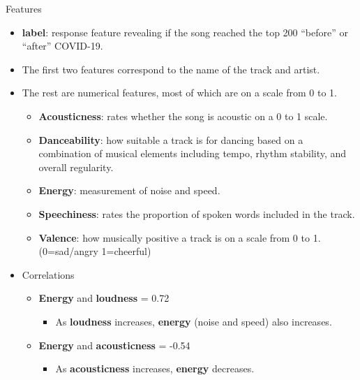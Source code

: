 \documentclass[landscape,a0paper,fontscale=0.34]{baposter}
\newcommand{\compresslistless}{%
 \setlength{\itemsep}{3.25pt}%
 \setlength{\parskip}{0pt}%
 \setlength{\parsep}{0pt}%
}
\newcommand{\rc}[1]{{\color{red}#1}}
\newcommand{\gc}[1]{{\color{green}#1}}
\begin{document}
\begin{poster}
\begin{posterbox}[name=features,column=0,row=0,span=1,below = intro]{Features}
    \compresslistless
\begin{itemize}[noitemsep]
    \item \textbf{label}: response feature revealing if the song reached the top 200 “before” or “after” COVID-19.
    \item The first two features correspond to the name of the track and artist.
	\item The rest are numerical features, most of which are on a scale from 0 to 1.
		\begin{itemize}[noitemsep]
		    \item \textbf{Acousticness}: rates whether the song is acoustic on a 0 to 1 scale.
		    \item \textbf{Danceability}: how suitable a track is for dancing based on a combination of musical elements including tempo, rhythm stability, and overall regularity.
			\item \textbf{Energy}: measurement of noise and speed.
			\item \textbf{Speechiness}: rates the proportion of spoken words included in the track. 
			\item \textbf{Valence}: how musically positive a track is on a scale from 0 to 1.  (0=sad/angry 1=cheerful)
		\end{itemize}
	\item Correlations
		\begin{itemize}[noitemsep]
			\item \textbf{Energy} and \textbf{loudness} = 0.72
				\begin{itemize}[noitemsep]
					\item As \textbf{loudness} \gc{increases}, \textbf{energy} (noise and speed) also \gc{increases}.
				\end{itemize}
			\item \textbf{Energy} and \textbf{acousticness} = -0.54
				\begin{itemize}[noitemsep]
					\item As \textbf{acousticness} \gc{increases}, \textbf{energy} \rc{decreases}.
				\end{itemize}
		\end{itemize}
\end{itemize}


\end{posterbox}
\end{poster}
\end{document}
